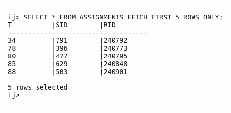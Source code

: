 \begin{tabular}{p{}}
\begin{verbatim}
ij> SELECT * FROM ASSIGNMENTS FETCH FIRST 5 ROWS ONLY;
T          |SID        |RID
-----------------------------------
34         |791        |240792
78         |396        |240773
80         |477        |240795
85         |629        |240848
88         |503        |240901

5 rows selected
ij>
\end{verbatim}\\
\end{tabular}
